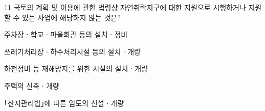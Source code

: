 \begin{question}{11}
국토의 계획 및 이용에 관한 법령상 자연취락지구에 대한 지원으로 시행하거나 지원할 수 있는 사업에 해당하지 않는 것은?
\begin{choices}
  \item 주차장ㆍ학교ㆍ마을회관 등의 설치ㆍ정비
  \item 쓰레기처리장ㆍ하수처리시설 등의 설치ㆍ개량
  \item 하천정비 등 재해방지를 위한 시설의 설치ㆍ개량
  \item 주택의 신축ㆍ개량
  \item ｢산지관리법｣에 따른 임도의 신설ㆍ개량
\end{choices}
\end{question}
